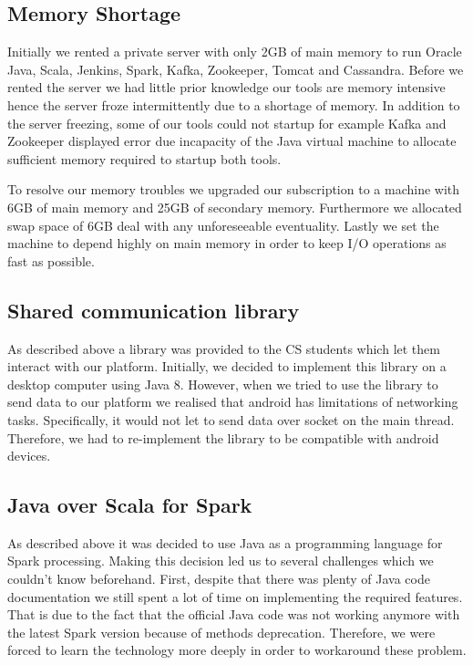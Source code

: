 \documentclass[prodmode,acmtosem]{acmsmall} %
\begin{document}
\subsection{Memory Shortage}
Initially we rented a private server with only 2GB of main memory to run Oracle Java, Scala, Jenkins, Spark, Kafka, Zookeeper, Tomcat and Cassandra. Before we rented the server we had little prior knowledge our tools are memory intensive hence the server froze intermittently due to a shortage of memory. In addition to the server freezing, some of our tools could not startup for example Kafka and Zookeeper displayed error due incapacity of the Java virtual machine to allocate sufficient memory required to startup both tools. 

To resolve our memory troubles we upgraded our subscription to a machine with 6GB of main memory and 25GB of secondary memory. Furthermore we allocated swap space of 6GB deal with any unforeseeable eventuality. Lastly we set the machine to depend highly on main memory in order to keep I/O operations as fast as possible.

\subsection{Shared communication library}
As described above a library was provided to the CS students which let them interact with our platform. Initially, we decided to implement this library on a desktop computer using Java 8. However, when we tried to use the library to send data to our platform we realised that android has limitations of networking tasks. Specifically, it would not let to send data over socket on the main thread. Therefore, we had to re-implement the library to be compatible with android devices.

\subsection{Java over Scala for Spark}
As described above it was decided to use Java as a programming language for Spark processing. Making this decision led us to several challenges which we couldn't know beforehand. First, despite that there was plenty of Java code documentation we still spent a lot of time on implementing the required features. That is due to the fact that the official Java code was not working anymore with the latest Spark version because of methods deprecation. Therefore, we were forced to learn the technology more deeply in order to workaround these problem. 
\end{document}
